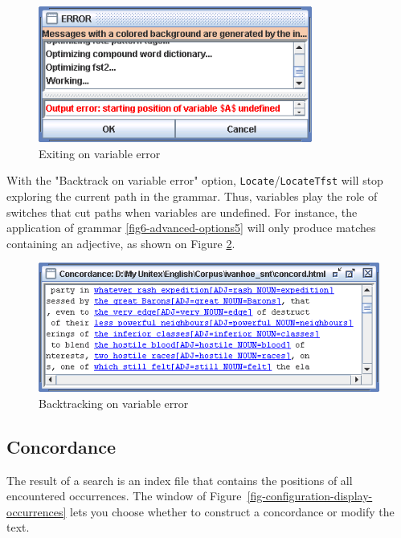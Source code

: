 \bigskip
\begin{figure}[!h]
\begin{center}
\includegraphics[width=9cm]{resources/img/fig6-advanced-options7.png}
\caption{Exiting on variable error\label{fig6-advanced-options7}}
\end{center}
\end{figure}

\noindent With the "Backtrack on variable error" option,
\verb+Locate+/\verb+LocateTfst+ will stop exploring the current path in the
grammar. Thus, variables play the role of switches that cut paths
when variables are undefined. For instance, the application of grammar
\ref{fig6-advanced-options5} will only produce matches containing an adjective, as shown on Figure 
\ref{fig6-advanced-options8}. 

\bigskip
\begin{figure}[!h]
\begin{center}
\includegraphics[width=13cm]{resources/img/fig6-advanced-options8.png}
\caption{Backtracking on variable error\label{fig6-advanced-options8}}
\end{center}
\end{figure}



\subsection{Concordance}
The result of a search is an index file that contains the positions of all
encountered occurrences.
The window of Figure~\ref{fig-configuration-display-occurrences} lets you
choose whether to construct a concordance or modify the text.

